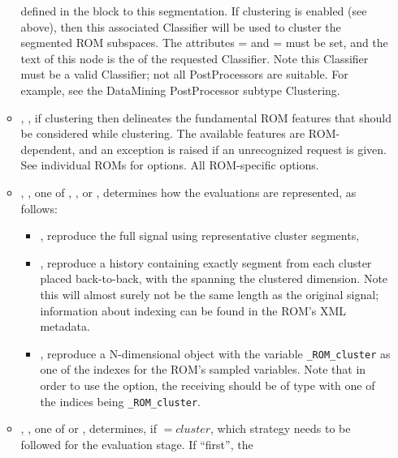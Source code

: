 \begin{itemize}
\begin{itemize}
        defined in the  block to this segmentation. If clustering is enabled (see
         above), then this associated Classifier will be used to cluster the segmented ROM
        subspaces. The attributes = and
        = must be set, and the text of this node is the 
        of the requested Classifier. Note this Classifier must be a valid Classifier; not all PostProcessors
        are suitable. For example, see the DataMining PostProcessor subtype Clustering.
      \item {}, , if clustering then delineates
        the fundamental ROM features that should be considered while clustering. The available features are
        ROM-dependent, and an exception is raised if an unrecognized request is given. See individual ROMs
        for options.  All ROM-specific options.
      \item {}, , one of ,
        , or , determines how the evaluations are
        represented, as follows:
        \begin{itemize}
          \item {}, reproduce the full signal using representative cluster segments,
          \item {}, reproduce a history containing exactly segment from each
            cluster placed back-to-back, with the  spanning the clustered
            dimension. Note this will almost surely not be the same length as the original signal;
            information about indexing can be found in the ROM's XML metadata.
          \item {}, reproduce a N-dimensional object with the variable
            \texttt{\_ROM\_cluster} as one of the indexes for the ROM's sampled variables. Note that
            in order to use the option, the receiving  should be of type
             with one of the indices being \texttt{\_ROM\_cluster}.
        \end{itemize}
     \item {}, , one of  or
        , determines, if $=cluster$, which
        strategy needs to be followed for the evaluation stage. If ``first'', the

\end{itemize}
\end{itemize}
